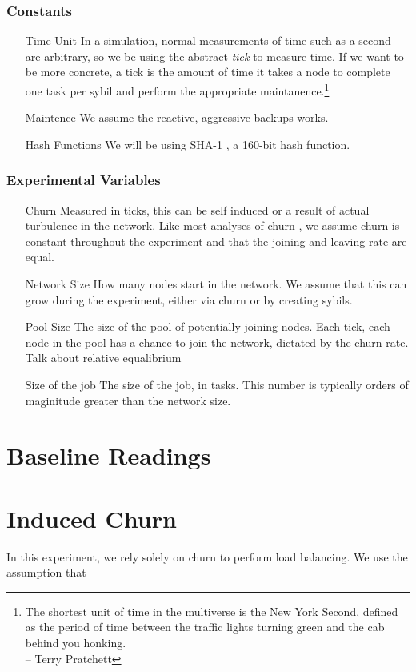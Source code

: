 \subsubsection{Constants}

\begin{enumerate}
	\item[Time Unit] In a simulation, normal measurements of time such as a second are arbitrary, so we be using the abstract \textit{tick} to measure time.  
	If we want to be more concrete, a tick is the amount of time it takes a node to complete one task per sybil and perform the appropriate maintanence.\footnote{The shortest unit of time in the multiverse is the New York Second, defined as the period of time between the traffic lights turning green and the cab behind you honking.\\-- Terry Pratchett}
	\item[Maintence] We assume the reactive, aggressive backups works.
	\item[Hash Functions] We will be using SHA-1 \cite{sha1}, a 160-bit hash function.
\end{enumerate}

\subsubsection{Experimental Variables}
\begin{enumerate}
	\item[Churn] Measured in ticks, this can be self induced or a result of actual turbulence in the network.
	Like most analyses of churn \cite{marozzo2012p2p}, we assume churn is constant throughout the experiment and that the joining and leaving rate are equal.
	\item[Network Size]  How many nodes start in the network.  
		We assume that this can grow during the experiment, either via churn or by creating sybils.
	\item[Pool Size]  The size of the pool of potentially joining nodes.  Each tick, each node in the pool has a chance to join the network, dictated by the churn rate.
		Talk about relative equalibrium
	\item[Size of the job] The size of the job, in tasks.
		This number is typically orders of maginitude greater than the network size.
\end{enumerate}



\section{Baseline Readings}

\section{Induced Churn}
In this experiment, we rely solely on churn to perform load balancing.
We use the assumption that 

